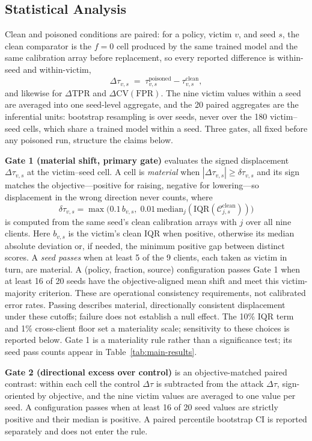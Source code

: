 \subsection{Statistical Analysis}

Clean and poisoned conditions are paired: for a policy, victim $v$, and seed $s$, the clean comparator is the $f{=}0$ cell produced by the same trained model and the same calibration array before replacement, so every reported difference is within-seed and within-victim,
\[
  \Delta\tau_{v,s} \;=\; \tau^{\mathrm{poisoned}}_{v,s} - \tau^{\mathrm{clean}}_{v,s},
\]
and likewise for $\Delta\mathrm{TPR}$ and $\Delta\mathrm{CV(FPR)}$.
The nine victim values within a seed are averaged into one seed-level aggregate, and the 20 paired aggregates are the inferential units: bootstrap resampling is over seeds, never over the 180 victim--seed cells, which share a trained model within a seed.
Three gates, all fixed before any poisoned run, structure the claims below.

\textbf{Gate 1 (material shift, primary gate)} evaluates the signed displacement $\Delta\tau_{v,s}$ at the victim--seed cell.
A cell is \emph{material} when $|\Delta\tau_{v,s}| \ge \delta\tau_{v,s}$ and its sign matches the objective---positive for raising, negative for lowering---so displacement in the wrong direction never counts, where
\[
  \delta\tau_{v,s} = \max\!\bigl(0.1\,b_{v,s},\;
  0.01\,\mathrm{median}_j(\mathrm{IQR}(\mathcal{C}_{j,s}^{\mathrm{clean}}))\bigr)
\]
is computed from the same seed's clean calibration arrays with $j$ over all nine clients. Here $b_{v,s}$ is the victim's clean IQR when positive, otherwise its median absolute deviation or, if needed, the minimum positive gap between distinct scores.
A \emph{seed passes} when at least 5 of the 9 clients, each taken as victim in turn, are material. A (policy, fraction, source) configuration passes Gate 1 when at least 16 of 20 seeds have the objective-aligned mean shift and meet this victim-majority criterion. These are operational consistency requirements, not calibrated error rates.
Passing describes material, directionally consistent displacement under these cutoffs; failure does not establish a null effect.
The 10\% IQR term and 1\% cross-client floor set a materiality scale; sensitivity to these choices is reported below.
Gate 1 is a materiality rule rather than a significance test; its seed pass counts appear in Table~\ref{tab:main-results}.

\textbf{Gate 2 (directional excess over control)} is an objective-matched paired contrast: within each cell the control $\Delta\tau$ is subtracted from the attack $\Delta\tau$, sign-oriented by objective, and the nine victim values are averaged to one value per seed.
A configuration passes when at least 16 of 20 seed values are strictly positive and their median is positive. A paired percentile bootstrap CI is reported separately and does not enter the rule.

